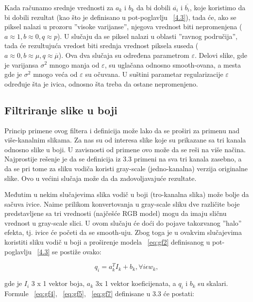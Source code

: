 \documentclass[a4paper,12pt,titlepage]{article}
\begin{document}
Kada računamo srednje vrednosti za $a_k$ i $b_k$ da bi dobili $\overline{a_i}$ i $\overline{b_i}$, koje koristimo da bi dobili rezultat (kao što je definisano u pot-poglavlju ~\ref{4.3}), tada će, ako se piksel nalazi u prozoru ''visoke varijanse'', njegova vrednost biti nepromenjena ($a \approx 1, b \approx 0, q \approx p$). U slučaju da se piksel nalazi u oblasti ''ravnog područija'', tada će rezultujuća vredost biti srednja vrednost piksela suseda ($a \approx 0, b \approx \mu, q \approx \overline{\mu}$). Ova dva slučaja su određena parametrom $\varepsilon$. Delovi slike, gde je varijansa $\sigma^2$ mnogo manja od $\varepsilon$, su uglačana odnosno smooth-ovana, a mesta gde je $\sigma^2$ mnogo veća od $\varepsilon$ su očuvana. U suštini parametar regularizacije $\varepsilon$ određuje šta je ivica, odnosno šta treba da ostane nepromenjeno. 

\subsection{Filtriranje slike u boji}%

Princip primene ovog filtera i definicija može lako da se proširi za primenu nad više-kanalnim slikama. Za nas su od interesa slike koje su prikazane sa tri kanala odnosno slike u boji. U zavisnosti od primene ovo može da se reši na više načina. Najprostije rešenje je da se definicija iz 3.3 primeni na sva tri kanala zasebno, a da se pri tome za sliku vodiča koristi gray-scale (jedno-kanalna) verzija originalne slike. Ovo u većini slučaja može da da zadovoljavajuće rezultate. 

Međutim u nekim slučajevima slika vodič u boji (tro-kanalna slika) može bolje da sačuva ivice. Naime prilikom konvertovanja u gray-scale sliku dve različite boje predstavljene sa tri vrednosti (najčešće RGB model) mogu da imaju sličnu vrednost u gray-scale slici. U ovom slučaju će doći do pojave takozvanog ''halo'' efekta, tj. ivice će početi da se smooth-uju. Zbog toga je u ovakvim slučajevima koristiti sliku vodič u boji a proširenje modela ~\ref{eq:gf2} definisanog u pot-poglavlju ~\ref{4.3} se postiže ovako:

\begin{equation}\label{gf10}
q_i = a_k^T I_k + b_k, \forall i \epsilon w_k,
\end{equation} 

gde je $I_i$ 3 x 1 vektor boja, $a_k$ 3x 1 vektor koeficijenata, a $q_i$ i $b_k$ su skalari. Formule ~\ref{eq:gf4}, ~\ref{eq:gf5}, ~\ref{eq:gf7} definisane u 3.3 će postati:
\end{document}
